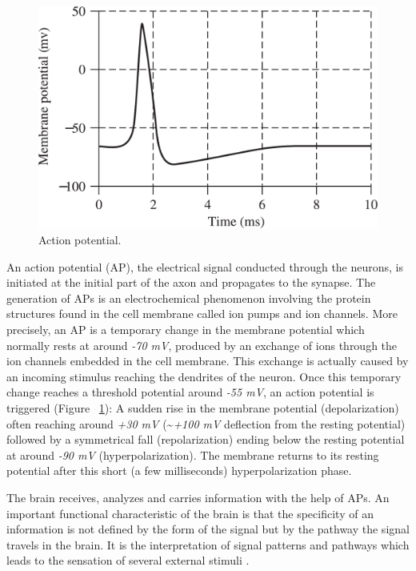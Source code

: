 \documentclass[12pt]{article}
\numberwithin{equation}{section}
\numberwithin{figure}{section}
\numberwithin{table}{section}
\begin{document}
\par{
    \begin{figure}[ht]
        \centering
        \includegraphics[scale=0.4]{images/ap}
        \caption[Action potential.]{Action potential. \citep{sanei_eeg_2008}}
        \label{fig:action_pot}
    \end{figure}
    An action potential (AP), the electrical signal conducted through the neurons,
    is initiated at the initial part of the axon and propagates to the synapse.
    The generation of APs is an electrochemical phenomenon involving the protein
    structures found in the cell membrane called ion pumps and ion channels.
    More precisely, an AP is a temporary change in the membrane potential which
    normally rests at around \emph{-70 mV}, produced by an exchange of ions through the
    ion channels embedded in the cell membrane. This exchange is actually
    caused by an incoming stimulus reaching the dendrites of the neuron.
    Once this temporary change reaches a threshold potential around \emph{-55 mV}, an action potential is triggered
    (Figure ~\ref{fig:action_pot}): A sudden rise in the membrane potential (depolarization) often
    reaching around \emph{+30 mV} (\textasciitilde\emph{+100 mV} deflection from the resting
    potential) followed by a symmetrical fall (repolarization) ending below the resting potential
    at around \emph{-90 mV} (hyperpolarization). The membrane returns to its resting
    potential after this short (a few milliseconds) hyperpolarization phase.
}
\par{
    The brain receives, analyzes and carries information with the help of APs.
    An important functional characteristic of the brain is that the specificity
    of an information is not defined by the form of the signal but by the pathway
    the signal travels in the brain. It is the interpretation of signal patterns
    and pathways which leads to the sensation of several external stimuli \citep{kandel_principles_2013}.
}
\end{document}
